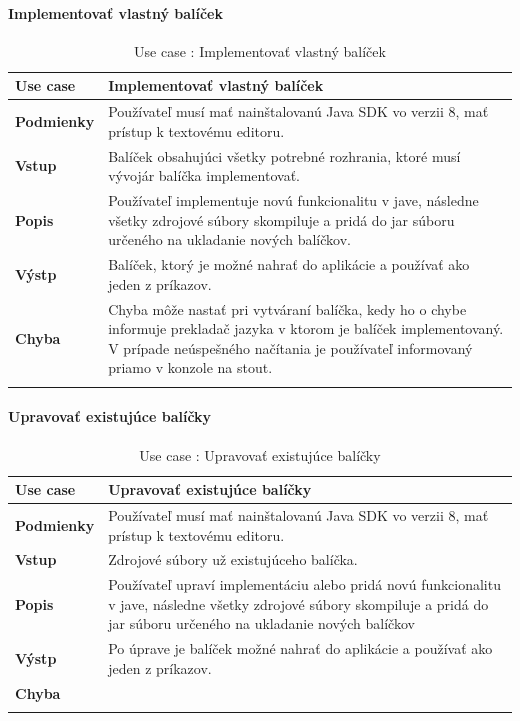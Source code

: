 \paragraph{Implementovať vlastný balíček}
\begin{center}
	\begin{longtable}{|p{2.5cm}|p{14cm}|}
		
			\hline
			\textbf{Use case} & Implementovať vlastný balíček \\ 
			\hline
			\textbf{Podmienky} & Používateľ musí mať nainštalovanú Java SDK vo verzii 8, mať prístup k textovému editoru.  \\ 
			\hline
			\textbf{Vstup} & Balíček obsahujúci všetky potrebné rozhrania, ktoré musí vývojár balíčka implementovať.\\
			\hline
			\textbf{Popis} & Používateľ implementuje novú funkcionalitu v jave, následne všetky zdrojové súbory skompiluje a pridá do jar súboru určeného na ukladanie nových balíčkov.\\ 
			\hline
			\textbf{Výstp} & Balíček, ktorý je možné nahrať do aplikácie a používať ako jeden z príkazov.\\
			\hline
			\textbf{Chyba} & Chyba môže nastať pri vytváraní balíčka, kedy ho o chybe informuje prekladač jazyka v ktorom je balíček implementovaný. V prípade neúspešného načítania je používateľ informovaný priamo v konzole na stout.\\
			\hline
		\caption{Use case : Implementovať vlastný balíček}
		\label{table:1}
		
	\end{longtable}
\end{center}

\paragraph{Upravovať existujúce balíčky}
\begin{center}
	\begin{longtable}{|p{2.5cm}|p{14cm}|}
		
			\hline
			\textbf{Use case} & Upravovať existujúce balíčky \\ 
			\hline
			\textbf{Podmienky} &  Používateľ musí mať nainštalovanú Java SDK vo verzii 8, mať prístup k textovému editoru.  \\ 
			\hline
			\textbf{Vstup} & Zdrojové súbory už existujúceho balíčka.\\
			\hline
			\textbf{Popis} & Používateľ upraví implementáciu alebo pridá novú funkcionalitu v jave, následne všetky zdrojové súbory skompiluje a pridá do jar súboru určeného na ukladanie nových balíčkov\\ 
			\hline
			\textbf{Výstp} & Po úprave je balíček možné nahrať do aplikácie a používať ako jeden z príkazov.\\
			\hline
			\textbf{Chyba} & \\
			\hline
		\caption{Use case : Upravovať existujúce balíčky}
		\label{table:1}
		
	\end{longtable}
\end{center}

